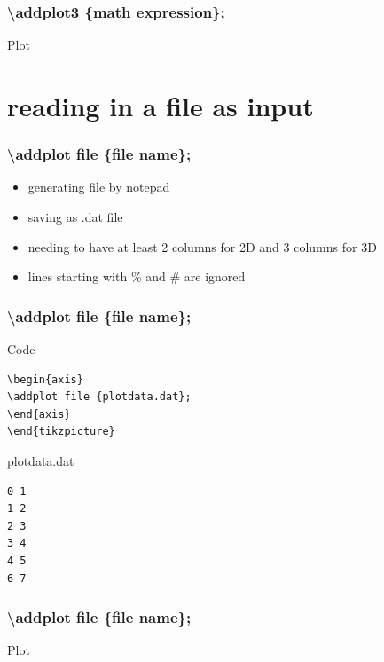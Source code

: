 \documentclass{beamer}
\begin{document}
\begin{frame}[fragile]
\frametitle{\color{blue}\textbackslash addplot3 \color{black} \{math expression\};}
\begin{block}{Plot}
\end{block}
\end{frame}
\section{reading in a file as input}
\begin{frame}[fragile]
\frametitle{\color{blue}\textbackslash addplot file \color{black} \{file name\};}
\begin{itemize}
\item generating file by notepad
\item saving as .dat file
\item needing to have at least 2 columns for 2D and 3 columns for 3D
\item lines starting with \% and \# are ignored
\end{itemize}
\end{frame}
\begin{frame}[fragile]
\frametitle{\color{blue}\textbackslash addplot file \color{black} \{file name\};}
\begin{block}{Code}
\begin{verbatim}
\begin{axis}
\addplot file {plotdata.dat};
\end{axis}
\end{tikzpicture}
\end{verbatim}
\end{block}
\begin{block}{plotdata.dat}
\begin{verbatim}
0 1
1 2
2 3
3 4
4 5
6 7
\end{verbatim}
\end{block}
\end{frame}
\begin{frame}[fragile]
\frametitle{\color{blue}\textbackslash addplot file \color{black} \{file name\};}
\begin{block}{Plot}
\end{block}
\end{frame}
\end{document}
